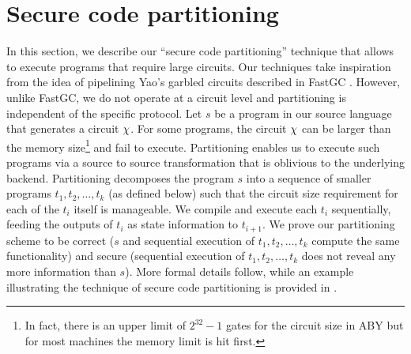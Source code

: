 \section{Secure code partitioning}
\label{sec:pipe}

\newcommand{\prog}{s}
\newcommand{\progn}{t}
\newcommand{\mprog}{u}
\newcommand{\seq}{||}
\newcommand{\stateq}{q}

In this section, we describe our ``secure code partitioning'' technique that
allows \tool to execute programs that require large circuits.
Our techniques take inspiration from the idea of pipelining Yao's garbled circuits described in FastGC \cite{yao-pipe}.
However, unlike FastGC, we do not operate at a circuit level and partitioning is independent of the specific
\mpc protocol. 
Let $\prog$ be a program in our source language that
generates a circuit $\chi$. For some programs, the circuit $\chi$
can be larger than
the memory size\footnote{In fact, there is
  an upper limit of $2^{32}-1$ gates for the circuit size in ABY but
  for most machines the memory limit is hit first.} and fail to
execute. Partitioning enables us to 
execute such programs via a source to source transformation that is
oblivious to the underlying \mpc backend. Partitioning decomposes the
program $\prog$ into a sequence of smaller \tool programs
$\progn_1,\progn_2,\ldots,\progn_k$ (as defined below) such
that the circuit size
requirement for each of the $\progn_i$ itself is manageable. We compile
and execute each $\progn_i$ sequentially, feeding the outputs of
$\progn_i$ as state
information to $\progn_{i+1}$. We prove our partitioning scheme to be
correct ($\prog$ and sequential execution of $\progn_1,\progn_2,\ldots,\progn_k$ compute
the same functionality) and secure (sequential execution of
$\progn_1,\progn_2,\ldots,\progn_k$ does
not reveal any more information than $\prog$). 
%
%
More formal details follow, while an example illustrating the technique of secure code partitioning is provided in  . 

